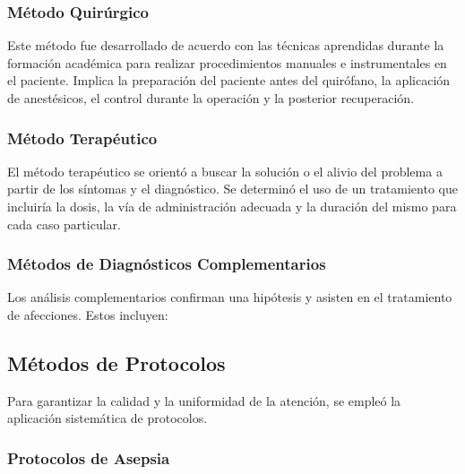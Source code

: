 	\subsubsection{Método Quirúrgico}

	Este método fue desarrollado de acuerdo con las técnicas aprendidas durante la formación académica para realizar procedimientos manuales e instrumentales en el paciente. Implica la preparación del paciente antes del quirófano, la aplicación de anestésicos, el control durante la operación y la posterior recuperación.

	\subsubsection{Método Terapéutico}

	El método terapéutico se orientó a buscar la solución o el alivio del problema a partir de los síntomas y el diagnóstico. Se determinó el uso de un tratamiento que incluiría la dosis, la vía de administración adecuada y la duración del mismo para cada caso particular.

	\subsubsection{Métodos de Diagnósticos Complementarios}

	Los análisis complementarios confirman una hipótesis y asisten en el tratamiento de afecciones. Estos incluyen:


	\subsection{Métodos de Protocolos}

	Para garantizar la calidad y la uniformidad de la atención, se empleó la aplicación sistemática de protocolos.

	\subsubsection{Protocolos de Asepsia}


